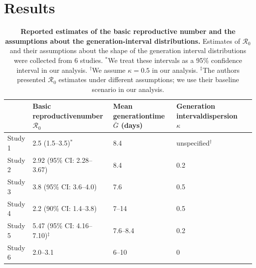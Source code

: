 \documentclass[12pt]{article}
\newcommand{\Rx}[1]{\ensuremath{{\mathcal R}_{#1}}}
\newcommand{\Ro}{\Rx{0}\xspace}
\begin{document}
\section{Results}

\begin{table}[t]
\begin{center}
\scriptsize
\begin{tabular}{l|p{3.5cm}|p{2.5cm}|p{2.5cm}|l}
 & Basic reproductive\newline number \Ro\ & Mean generation\newline time $\bar G$ (days) & Generation interval\newline dispersion $\kappa$ \\
\hline
Study 1 & 2.5 (1.5--3.5)$^\ast$ & 8.4 & unspecified$^\dagger$ & \cite{imaincov} \\
\hline
Study 2 & 2.92 (95\% CI: 2.28--3.67) & 8.4 & 0.2 & \cite{liuncov} \\
\hline
Study 3 & 3.8 (95\% CI: 3.6--4.0) & 7.6 & 0.5 & \cite{readncov} \\
\hline
Study 4 & 2.2 (90\% CI: 1.4--3.8) & 7--14 & 0.5 & \cite{riouncov} \\
\hline
Study 5 & 5.47 (95\% CI: 4.16--7.10)$^\ddagger$ & 7.6--8.4 & 0.2 & \cite{zhaoncov} \\
\hline
Study 6 & 2.0--3.1 & 6--10 & 0 & \cite{majumderncov} \\
\hline
\end{tabular}
\end{center}
\caption{
\textbf{Reported estimates of the basic reproductive number and the assumptions about the generation-interval distributions.}
Estimates of \Ro and their assumptions about the shape of the generation interval distributions were collected from 6 studies.
$^\ast$We treat these intervals as a 95\% confidence interval in our analysis.
$^\dagger$We assume $\kappa = 0.5$ in our analysis.
$^\ddagger$The authors presented \Ro estimates under different assumptions; we use their baseline scenario in our analysis.
}
\end{table}
\end{document}
